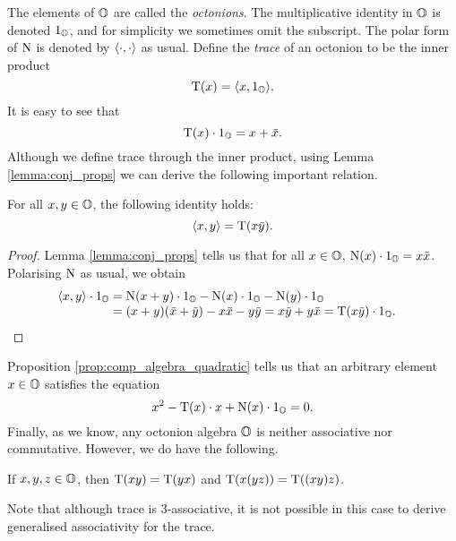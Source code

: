 The elements of $\mathbb{O}$ are called the \textit{octonions}. 
The multiplicative identity in $\mathbb{O}$ is denoted $1_{\mathbb{O}}$, and for simplicity we sometimes omit the subscript. The polar form of $\mathord{\mathrm{N}}$ is denoted by $\langle \cdot, \cdot \rangle$ as usual. Define the 
\textit{trace} of an octonion to be the inner product
\begin{equation}
	\operatorname{T}(x) = \langle x, 1_{\mathbb{O}} \rangle.
\end{equation}
It is easy to see that
\begin{equation}
	\operatorname{T}(x)\cdot 1_{\mathbb{O}} = x + \mathord{\mbox{\hspace*{0pt}}\,\overline{\!x\!\!\;}\!\:}\mbox{\hspace*{0pt}}. 
\end{equation}
Although we define trace through the inner product, using Lemma \ref{lemma:conj_props} we can
derive the following important relation.
\begin{lemma}
	For all $x,y \in \mathbb{O}$, the following identity holds:
	\begin{equation}
		\langle x, y \rangle = \operatorname{T}(x\mathord{\mbox{\hspace*{0pt}}\,\overline{\!y\!\!\;}\!\:}\mbox{\hspace*{0pt}}).
	\end{equation}
\end{lemma}
\begin{proof}
	Lemma \ref{lemma:conj_props} tells us that for all $x \in \mathbb{O}$, $\mathord{\mathrm{N}}(x)\cdot 1_{\mathbb{O}} = x \mathord{\mbox{\hspace*{0pt}}\,\overline{\!x\!\!\;}\!\:}\mbox{\hspace*{0pt}}$.
	Polarising $\mathord{\mathrm{N}}$ as usual, we obtain
	\begin{equation*}
		\begin{array}{r@{\;}c@{\;}l}
			\inner{x}{y}\cdot 1_{\O} & = &  \NN(x+y)\cdot 1_{\O} - \NN(x)\cdot 1_{\O} - 
												\NN(y)\cdot 1_{\O} \\							
			& = &  (x + y)(\ovx + \ovy) - x\ovx - y\ovy = x\ovy + y\ovx = \Tr(x\ovy) \cdot 1_{\O} .\ \ \  
		\end{array}
	\end{equation*}
	\par \vspace{-1.7\baselineskip} \qedhere
\end{proof}
Proposition \ref{prop:comp_algebra_quadratic} tells us that an arbitrary element $x \in \mathbb{O}$
satisfies the equation
\begin{equation}
	x^2 - \operatorname{T}(x)\cdot x + \mathord{\mathrm{N}}(x)\cdot 1_{\mathbb{O}} = 0.
\end{equation}
Finally, as we know, any octonion algebra $\mathbb{O}$ is neither associative nor commutative. However,
we do have the following.
\begin{lemma}
	If $x,y,z \in \mathbb{O}$, then $\operatorname{T}(xy) = \operatorname{T}(yx)$ and $\operatorname{T}(x(yz)) = \operatorname{T}((xy) z)$. 
\end{lemma}
Note that although trace is $3$-associative, it is not possible in this case to derive
generalised associativity for the trace. 

